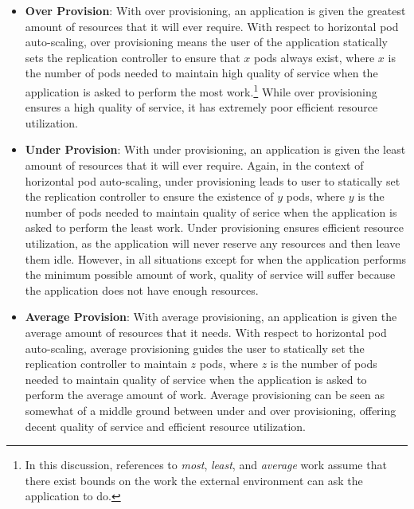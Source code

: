 \begin{itemize}
  \item \textbf{Over Provision}: With over provisioning, an application is given
    the greatest amount of resources that it will ever require. With respect to
    horizontal pod auto-scaling, over provisioning means the user of the
    application statically sets the replication controller to ensure that $x$ pods
    always exist, where $x$ is the number of pods needed to
    maintain high quality of service when the application is
    asked to perform the most work.\footnote{In this discussion, references to
      \textit{most}, \textit{least}, and \textit{average} work assume that there
      exist bounds on the work the external environment can ask the application to
      do.} While over provisioning ensures a high quality of service, it has extremely
    poor efficient resource utilization.
  \item \textbf{Under Provision}: With under provisioning, an application is
    given the least amount of resources that it will ever require. Again, in the
    context of horizontal pod auto-scaling, under provisioning leads to user to
    statically set the replication controller to ensure the existence of
    $y$ pods, where $y$ is the number of pods needed to maintain quality of
    serice when the application is asked to perform the least work. Under
    provisioning ensures efficient resource utilization, as the application will
    never reserve any resources and then leave them idle. However, in all
    situations except for when the application performs the minimum possible
    amount of work, quality of service will suffer because the application does
    not have enough resources.
  \item \textbf{Average Provision}: With average provisioning, an application is
    given the average amount of resources that it needs. With respect to
    horizontal pod auto-scaling, average provisioning guides the user to
    statically set the replication controller to maintain $z$ pods, where
    $z$ is the number of pods needed to maintain quality of service when the
    application is asked to perform the average amount of work. Average
    provisioning can be seen as somewhat of a middle ground between under and
    over provisioning, offering decent quality of service and efficient resource
    utilization.
\end{itemize}

